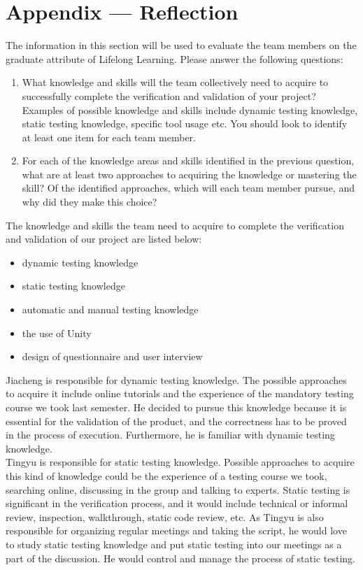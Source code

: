 \documentclass[12pt, titlepage]{article}
\begin{document}
\newpage


\newpage{}
\section*{Appendix --- Reflection}

The information in this section will be used to evaluate the team members on the
graduate attribute of Lifelong Learning.  Please answer the following questions:

\begin{enumerate}
  \item What knowledge and skills will the team collectively need to acquire to
  successfully complete the verification and validation of your project?
  Examples of possible knowledge and skills include dynamic testing knowledge,
  static testing knowledge, specific tool usage etc.  You should look to
  identify at least one item for each team member.
  \item For each of the knowledge areas and skills identified in the previous
  question, what are at least two approaches to acquiring the knowledge or
  mastering the skill?  Of the identified approaches, which will each team
  member pursue, and why did they make this choice?
\end{enumerate}

The knowledge and skills the team need to acquire to complete the verification and validation of our project are listed below:
\begin{itemize}
    \item dynamic testing knowledge
    \item static testing knowledge
    \item automatic and manual testing knowledge
    \item the use of Unity
    \item design of questionnaire and user interview
\end{itemize}

Jiacheng is responsible for dynamic testing knowledge. The possible approaches to acquire it include online tutorials and the experience of the mandatory testing course we took last semester. He decided to pursue this knowledge because it is essential for the validation of the product, and the correctness has to be proved in the process of execution. Furthermore, he is familiar with dynamic testing knowledge.\\

Tingyu is responsible for static testing knowledge. Possible approaches to acquire this kind of knowledge could be the experience of a testing course we took, searching online, discussing in the group and talking to experts. Static testing is significant in the verification process, and it would include technical or informal review, inspection, walkthrough, static code review, etc. As Tingyu is also responsible for organizing regular meetings and taking the script, he would love to study static testing knowledge and put static testing into our meetings as a part of the discussion. He would control and manage the process of static testing.\\
\end{document}
